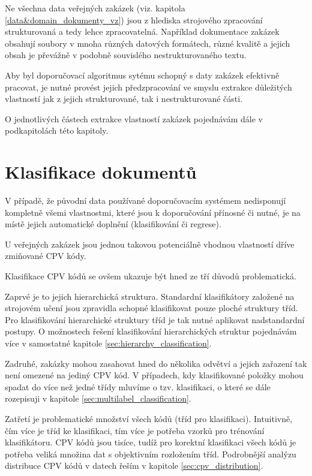 \documentclass[thesis=M,czech]{FITthesis}[2019/12/23]
\begin{document}
Ne všechna data veřejných zakázek (viz. kapitola \ref{data&domain_dokumenty_vz}) jsou z hlediska strojového zpracování strukturovaná a tedy lehce zpracovatelná. Například dokumentace zakázek obsahují soubory v mnoha různých datových formátech, různé kvalitě a jejich obsah je převážně v podobně souvislého nestrukturovaného textu.

Aby byl doporučovací algoritmus sytému schopný s daty zakázek efektivně pracovat, je nutné provést jejich předzpracování ve smyslu extrakce důležitých vlastností jak z jejich strukturované, tak i nestrukturované části.

O jednotlivých částech extrakce vlastností zakázek pojednávám dále v podkapitolách této kapitoly.

\section{Klasifikace dokumentů}

V případě, že původní data používané doporučovacím systémem nedisponují kompletně všemi vlastnostmi, které jsou k doporučování přínosné či nutné, je na místě jejich automatické doplnění (klasifikování či regrese).

U veřejných zakázek jsou jednou takovou potenciálně vhodnou vlastností dříve zmiňované CPV kódy. 

Klasifikace CPV kódů se ovšem ukazuje být hned ze tří důvodů problematická.

Zaprvé je to jejich hierarchická struktura. Standardní klasifikátory založené na strojovém učení jsou zpravidla schopné klasifikovat pouze ploché struktury tříd. Pro klasifikování hierarchické struktury tříd je tak nutné aplikovat nadstandardní postupy. O možnostech řešení klasifikování hierarchických struktur pojednávám více v samostatné kapitole \ref{sec:hierarchy_classification}.

Zadruhé, zakázky mohou zasahovat hned do několika odvětví a jejich zařazení tak není omezené na jediný CPV kód. V případech, kdy klasifikované položky mohou spadat do více než jedné třídy mluvíme o tzv.  klasifikaci, o které se dále rozepisuji v kapitole \ref{sec:multilabel_classification}.

Zatřetí je problematické množství všech kódů (tříd pro klasifikaci). Intuitivně, čím více je tříd ke klasifikaci, tím více je potřeba vzorků pro trénování klasifikátoru. CPV kódů jsou tisíce, tudíž pro korektní klasifikaci všech kódů je potřeba veliká množina dat s objektivním rozložením tříd. Podrobnější analýzu distribuce CPV kódů v datech řeším v kapitole \ref{sec:cpv_distribution}.
\end{document}
